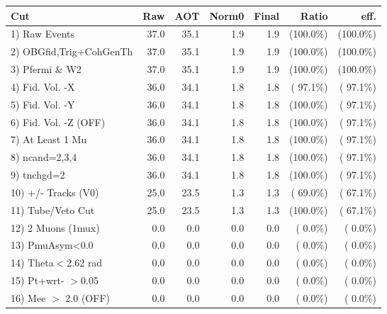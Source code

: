  \begin{table}[h!]\centering
 \begin{tabular}{||l||r|r|r|r|r|r||}
 \hline
 \hline
 Cut & Raw & AOT & Norm0 & Final & Ratio & eff.       \\
 \hline
  1) Raw Events           &         37.0 &         35.1 &          1.9 &          1.9 & (100.0\%) & (100.0\%) \\
  2) OBGfid,Trig+CohGenTh &         37.0 &         35.1 &          1.9 &          1.9 & (100.0\%) & (100.0\%) \\
  3) Pfermi \& W2         &         37.0 &         35.1 &          1.9 &          1.9 & (100.0\%) & (100.0\%) \\
  4) Fid. Vol. -X         &         36.0 &         34.1 &          1.8 &          1.8 & ( 97.1\%) & ( 97.1\%) \\
  5) Fid. Vol. -Y         &         36.0 &         34.1 &          1.8 &          1.8 & (100.0\%) & ( 97.1\%) \\
  6) Fid. Vol. -Z (OFF)   &         36.0 &         34.1 &          1.8 &          1.8 & (100.0\%) & ( 97.1\%) \\
  7) At Least 1 Mu        &         36.0 &         34.1 &          1.8 &          1.8 & (100.0\%) & ( 97.1\%) \\
  8) ncand=2,3,4          &         36.0 &         34.1 &          1.8 &          1.8 & (100.0\%) & ( 97.1\%) \\
  9) tnchgd=2             &         36.0 &         34.1 &          1.8 &          1.8 & (100.0\%) & ( 97.1\%) \\
 10) +/- Tracks (V0)      &         25.0 &         23.5 &          1.3 &          1.3 & ( 69.0\%) & ( 67.1\%) \\
 11) Tube/Veto Cut        &         25.0 &         23.5 &          1.3 &          1.3 & (100.0\%) & ( 67.1\%) \\
 12) 2 Muons (1mux)       &          0.0 &          0.0 &          0.0 &          0.0 & (  0.0\%) & (  0.0\%) \\
 13) PmuAsym<0.0          &          0.0 &          0.0 &          0.0 &          0.0 & (  0.0\%) & (  0.0\%) \\
 14) Theta$<$2.62 rad     &          0.0 &          0.0 &          0.0 &          0.0 & (  0.0\%) & (  0.0\%) \\
 15) Pt+wrt- $>$0.05      &          0.0 &          0.0 &          0.0 &          0.0 & (  0.0\%) & (  0.0\%) \\
 16) Mee $>$ 2.0  (OFF)   &          0.0 &          0.0 &          0.0 &          0.0 & (  0.0\%) & (  0.0\%) \\

\end{tabular}
\end{table}
